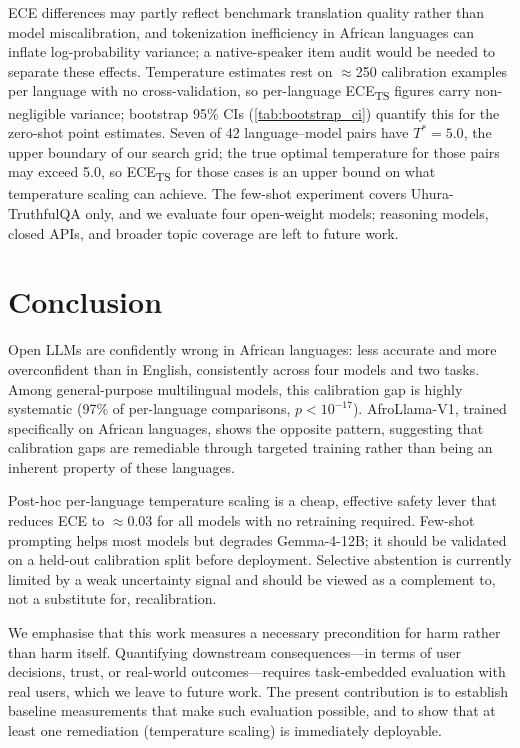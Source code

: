 \documentclass[11pt,a4paper]{article}
\begin{document}
ECE differences may partly reflect benchmark translation quality rather than
model miscalibration, and tokenization inefficiency in African languages can
inflate log-probability variance; a native-speaker item audit would be needed
to separate these effects. Temperature estimates rest on ${\approx}$250
calibration examples per language with no cross-validation, so per-language
ECE\textsubscript{TS} figures carry non-negligible variance; bootstrap 95\%
CIs (\cref{tab:bootstrap_ci}) quantify this for the zero-shot point estimates.
Seven of 42 language--model pairs have $T^* = 5.0$, the upper boundary of our
search grid; the true optimal temperature for those pairs may exceed 5.0, so
ECE\textsubscript{TS} for those cases is an upper bound on what temperature
scaling can achieve. The few-shot experiment covers Uhura-TruthfulQA only, and
we evaluate four open-weight models; reasoning models, closed APIs, and broader
topic coverage are left to future work.

\section{Conclusion}
\label{sec:conclusion}

Open LLMs are confidently wrong in African languages: less accurate and more
overconfident than in English, consistently across four models and two tasks.
Among general-purpose multilingual models, this calibration gap is highly
systematic (97\% of per-language comparisons, $p < 10^{-17}$). AfroLlama-V1,
trained specifically on African languages, shows the opposite pattern, suggesting
that calibration gaps are remediable through targeted training rather than being
an inherent property of these languages.

Post-hoc per-language temperature scaling is a cheap, effective safety lever that
reduces ECE to ${\approx}0.03$ for all models with no retraining required. Few-shot
prompting helps most models but degrades Gemma-4-12B; it should be validated on a
held-out calibration split before deployment. Selective abstention is currently
limited by a weak uncertainty signal and should be viewed as a complement to, not
a substitute for, recalibration.

We emphasise that this work measures a necessary precondition for harm rather than
harm itself. Quantifying downstream consequences---in terms of user decisions,
trust, or real-world outcomes---requires task-embedded evaluation with real users,
which we leave to future work. The present contribution is to establish baseline
measurements that make such evaluation possible, and to show that at least one
remediation (temperature scaling) is immediately deployable.
\end{document}
